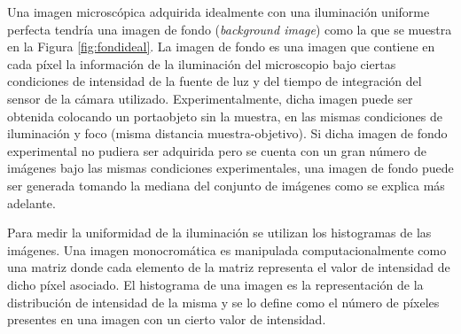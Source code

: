 Una imagen microscópica adquirida idealmente con una iluminación uniforme perfecta tendría una imagen de fondo (\textit{background image}) como la que se muestra en la Figura \ref{fig:fondideal}. La imagen de fondo es una imagen que contiene en cada píxel la información de la iluminación del microscopio bajo ciertas condiciones de intensidad de la fuente de luz y del tiempo de integración del sensor de la cámara utilizado. Experimentalmente, dicha imagen puede ser obtenida colocando un portaobjeto sin la muestra, en las mismas condiciones de iluminación y foco (misma distancia muestra-objetivo). Si dicha imagen de fondo experimental no pudiera ser adquirida pero se cuenta con un gran número de imágenes bajo las mismas condiciones experimentales, una imagen de fondo puede ser generada tomando la mediana del conjunto de imágenes como se explica más adelante.

Para medir la uniformidad de la iluminación se utilizan los histogramas de las imágenes. Una imagen monocromática es manipulada computacionalmente como una matriz donde cada elemento de la matriz representa el valor de intensidad de dicho píxel asociado. El histograma de una imagen es la representación de la distribución de intensidad de la misma y se lo define como el número de píxeles presentes en una imagen con un cierto valor de intensidad.

